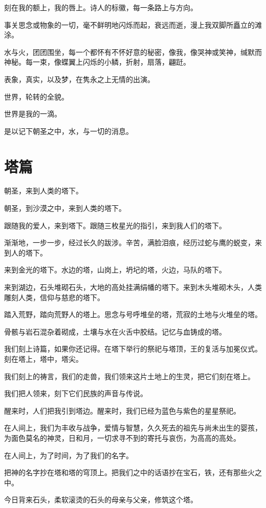 \documentclass[UTF8]{article}
\begin{document}
\par 刻在我的额上，我的唇上。诗人的标徽，每一条路上与方向。
\par 事关思念或物象的一切，毫不鲜明地闪烁而起，衰远而逝，漫上我双脚所矗立的滩涂。
\par 水与火，团团围坐，每一个都怀有不怀好意的秘密，像我，像哭神或笑神，缄默而神秘。每一束，像蝶翼上闪烁的小鳞，折射，扇落，翩跹。
\par 表象，真实，以及梦，在隽永之上无情的出演。
\par 世界，轮转的全貌。
\par 世界是我的一滴。
\par 是以记下朝圣之中，水，与一切的消息。
\section{塔篇}
\par 朝圣，来到人类的塔下。
\par 朝圣，到沙漠之中，来到人类的塔下。
\par 跟随我的爱人，来到塔下。跟随三枚星光的指引，来到我人们的塔下。
\par 渐渐地，一步一步，经过长久的跋涉。辛苦，满脸泪痕，经历过蛇与鹰的蜕变，来到人的塔下。
\par 来到金光的塔下。水边的塔，山岗上，坍圮的塔，火边，马队的塔下。
\par 来到湖边，石头堆砌石头，大地的高处挂满绢幡的塔下。来到木头堆砌木头，人类雕刻人类，信仰与慈悲的塔下。
\par 踏入荒野，踏向荒野人的塔上。思念与号呼堆垒的塔，荒寂的土地与火堆垒的塔。
\par 骨骸与岩石混杂着砌成，土壤与水在火舌中胶结。记忆与血铸成的塔。
\par 我们刻上诗篇，如果你还记得。在塔下举行的祭祀与塔顶，王的复活与加冕仪式。刻在塔上，塔中，塔尖。
\par 我们刻上的祷言，我们的走兽，我们领来这片土地上的生灵，把它们刻在塔上。
\par 我们把人领来，刻下它们民族的声音与传说。
\par 醒来时，人们把我引到塔边。醒来时，我们已经为蓝色与紫色的星星祭祀。
\par 在人间上，我们为丰收与战争，爱情与智慧，久久死去的祖先与尚未出生的婴孩，为面色莫名的神灵，日和月，一切求寻不到的寄托与哀伤，为高高的高处。
\par 在人间上，为了时间，为了我们的名字。
\par 把神的名字抄在塔和塔的穹顶上。把我们之中的话语抄在宝石，铁，还有那些火之中。
\par 今日背来石头，柔软滚烫的石头的母亲与父亲，修筑这个塔。
\end{document}
